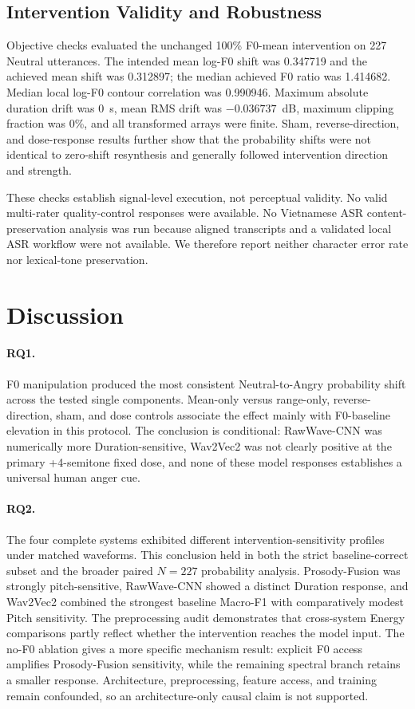 \documentclass[a4paper,runningheads]{llncs}
\begin{document}
\subsection{Intervention Validity and Robustness}

Objective checks evaluated the unchanged 100\% F0-mean intervention on 227 Neutral utterances. The intended mean log-F0 shift was 0.347719 and the achieved mean shift was 0.312897; the median achieved F0 ratio was 1.414682. Median local log-F0 contour correlation was 0.990946. Maximum absolute duration drift was 0~s, mean RMS drift was $-0.036737$~dB, maximum clipping fraction was 0\%, and all transformed arrays were finite. Sham, reverse-direction, and dose-response results further show that the probability shifts were not identical to zero-shift resynthesis and generally followed intervention direction and strength.

These checks establish signal-level execution, not perceptual validity. No valid multi-rater quality-control responses were available. No Vietnamese ASR content-preservation analysis was run because aligned transcripts and a validated local ASR workflow were not available. We therefore report neither character error rate nor lexical-tone preservation.

\section{Discussion}

\paragraph{RQ1.} F0 manipulation produced the most consistent Neutral-to-Angry probability shift across the tested single components. Mean-only versus range-only, reverse-direction, sham, and dose controls associate the effect mainly with F0-baseline elevation in this protocol. The conclusion is conditional: RawWave-CNN was numerically more Duration-sensitive, Wav2Vec2 was not clearly positive at the primary +4-semitone fixed dose, and none of these model responses establishes a universal human anger cue.

\paragraph{RQ2.} The four complete systems exhibited different intervention-sensitivity profiles under matched waveforms. This conclusion held in both the strict baseline-correct subset and the broader paired $N=227$ probability analysis. Prosody-Fusion was strongly pitch-sensitive, RawWave-CNN showed a distinct Duration response, and Wav2Vec2 combined the strongest baseline Macro-F1 with comparatively modest Pitch sensitivity. The preprocessing audit demonstrates that cross-system Energy comparisons partly reflect whether the intervention reaches the model input. The no-F0 ablation gives a more specific mechanism result: explicit F0 access amplifies Prosody-Fusion sensitivity, while the remaining spectral branch retains a smaller response. Architecture, preprocessing, feature access, and training remain confounded, so an architecture-only causal claim is not supported.
\end{document}
